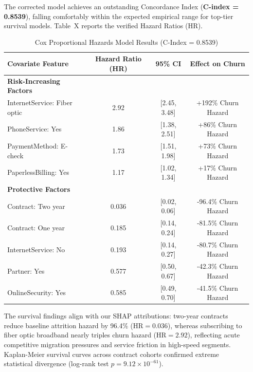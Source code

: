 \documentclass[conference]{IEEEtran}
\begin{document}
The corrected model achieves an outstanding Concordance Index (\textbf{C-index = 0.8539}), falling comfortably within the expected empirical range for top-tier survival models. Table~X reports the verified Hazard Ratios (HR).

\begin{table}[htbp]
\caption{Cox Proportional Hazards Model Results (C-Index = 0.8539)}
\label{tab:survival}
\centering
\begin{tabular}{lccc}
\toprule
\textbf{Covariate Feature} & \textbf{Hazard Ratio (HR)} & \textbf{95\% CI} & \textbf{Effect on Churn} \\
\midrule
\textbf{Risk-Increasing Factors} & & & \\
InternetService: Fiber optic & 2.92 & [2.45, 3.48] & +192\% Churn Hazard \\
PhoneService: Yes & 1.86 & [1.38, 2.51] & +86\% Churn Hazard \\
PaymentMethod: E-check & 1.73 & [1.51, 1.98] & +73\% Churn Hazard \\
PaperlessBilling: Yes & 1.17 & [1.02, 1.34] & +17\% Churn Hazard \\
\midrule
\textbf{Protective Factors} & & & \\
Contract: Two year & 0.036 & [0.02, 0.06] & -96.4\% Churn Hazard \\
Contract: One year & 0.185 & [0.14, 0.24] & -81.5\% Churn Hazard \\
InternetService: No & 0.193 & [0.14, 0.27] & -80.7\% Churn Hazard \\
Partner: Yes & 0.577 & [0.50, 0.67] & -42.3\% Churn Hazard \\
OnlineSecurity: Yes & 0.585 & [0.49, 0.70] & -41.5\% Churn Hazard \\
\bottomrule
\end{tabular}
\end{table}

The survival findings align with our SHAP attributions: two-year contracts reduce baseline attrition hazard by 96.4\% ($\text{HR}=0.036$), whereas subscribing to fiber optic broadband nearly triples churn hazard ($\text{HR}=2.92$), reflecting acute competitive migration pressures and service friction in high-speed segments. Kaplan-Meier survival curves across contract cohorts confirmed extreme statistical divergence (log-rank test $p = 9.12 \times 10^{-61}$).
\end{document}
